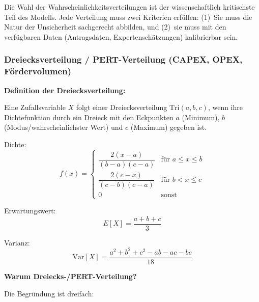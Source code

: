 \documentclass[12pt,a4paper]{article}
\begin{document}
Die Wahl der Wahrscheinlichkeitsverteilungen ist der wissenschaftlich kritischste Teil des Modells. Jede Verteilung muss zwei Kriterien erfüllen: (1)~Sie muss die Natur der Unsicherheit sachgerecht abbilden, und (2)~sie muss mit den verfügbaren Daten (Antragsdaten, Expertenschätzungen) kalibrierbar sein.

\subsubsection{Dreiecksverteilung / PERT-Verteilung (CAPEX, OPEX, Fördervolumen)}

\textbf{Definition der Dreiecksverteilung:}

Eine Zufallsvariable $X$ folgt einer Dreiecksverteilung $\text{Tri}(a, b, c)$, wenn ihre Dichtefunktion durch ein Dreieck mit den Eckpunkten $a$ (Minimum), $b$ (Modus/wahrscheinlichster Wert) und $c$ (Maximum) gegeben ist.

Dichte:
\begin{equation}
f(x) = \begin{cases}
  \dfrac{2(x-a)}{(b-a)(c-a)} & \text{für } a \leq x \leq b \\[8pt]
  \dfrac{2(c-x)}{(c-b)(c-a)} & \text{für } b < x \leq c \\[4pt]
  0 & \text{sonst}
\end{cases}
\end{equation}

Erwartungswert:
\begin{equation}
E[X] = \frac{a + b + c}{3}
\end{equation}

Varianz:
\begin{equation}
\text{Var}[X] = \frac{a^2 + b^2 + c^2 - ab - ac - bc}{18}
\end{equation}

\textbf{Warum Dreiecks-/PERT-Verteilung?}

Die Begründung ist dreifach:
\end{document}
